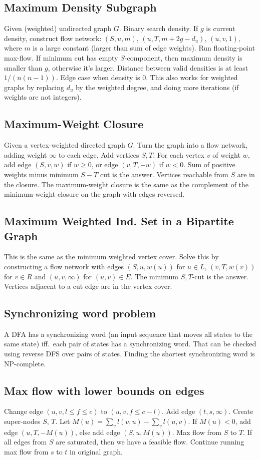 \documentclass[8pt,a4paper,landscape,oneside]{amsart}
\begin{document}
\begin{multicols*}{3}
  \subsection{Maximum Density Subgraph}
    Given (weighted) undirected graph $G$. Binary search density. If $g$ is
    current density, construct flow network: $(S, u, m)$, $(u, T,
    m+2g-d_u)$, $(u,v,1)$, where $m$ is a large constant (larger than sum
    of edge weights). Run floating-point max-flow. If minimum cut has empty
    $S$-component, then maximum density is smaller than $g$, otherwise it's
    larger. Distance between valid densities is at least $1/(n(n-1))$. Edge
    case when density is $0$. This also works for weighted graphs by
    replacing $d_u$ by the weighted degree, and doing more iterations (if
    weights are not integers).
  \subsection{Maximum-Weight Closure}
    Given a vertex-weighted directed graph $G$. Turn the graph into a flow
    network, adding weight $\infty$ to each edge. Add vertices $S,T$. For
    each vertex $v$ of weight $w$, add edge $(S,v,w)$ if $w\geq 0$, or edge
    $(v,T,-w)$ if $w<0$. Sum of positive weights minus minimum $S-T$ cut is
    the answer. Vertices reachable from $S$ are in the closure. The
    maximum-weight closure is the same as the complement of the
    minimum-weight closure on the graph with edges reversed.
  \subsection{Maximum Weighted Ind. Set in a Bipartite Graph}
    This is the same as the minimum weighted vertex cover. Solve this by
    constructing a flow network with edges $(S,u,w(u))$ for $u\in L$,
    $(v,T,w(v))$ for $v\in R$ and $(u,v,\infty)$ for $(u,v)\in E$. The
    minimum $S,T$-cut is the answer. Vertices adjacent to a cut edge are
    in the vertex cover.
  \subsection{Synchronizing word problem}
    A DFA has a synchronizing word (an input sequence that moves all states
    to the same state) iff.\ each pair of states has a synchronizing word.
    That can be checked using reverse DFS over pairs of states. Finding the
    shortest synchronizing word is NP-complete.
  \subsection{Max flow with lower bounds on edges}
    Change edge $(u,v,l\leq f\leq c)$ to $(u,v,f\leq c-l)$. Add edge
    $(t,s,\infty)$. Create super-nodes $S$, $T$. Let $M(u) = \sum_{v}
    l(v,u) - \sum_{v} l(u,v)$. If $M(u)<0$, add edge $(u,T,-M(u))$, else
    add edge $(S,u,M(u))$. Max flow from $S$ to $T$. If all edges from $S$
    are saturated, then we have a feasible flow. Continue running max flow
    from $s$ to $t$ in original graph.

\end{multicols*}
\end{document}
